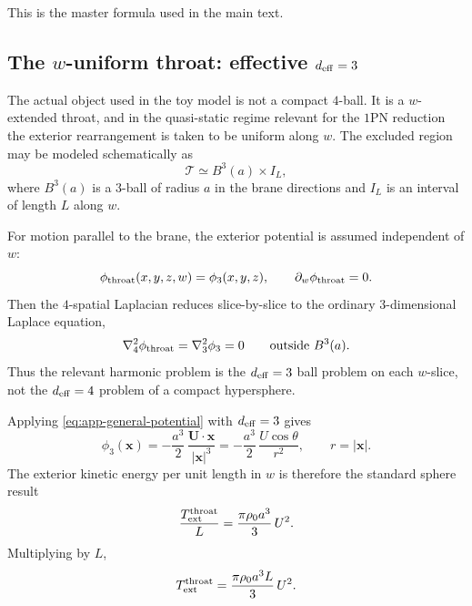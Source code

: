 \documentclass[11pt]{article}
\newcommand{\x}{\mathbf x}
\begin{document}
This is the master formula used in the main text.

\subsection{The \(w\)-uniform throat: effective \(d_{\rm eff}=3\)}
\label{app:added-mass-throat}

The actual object used in the toy model is not a compact \(4\)-ball. It is a
\(w\)-extended throat, and in the quasi-static regime relevant for the \(1\)PN reduction
the exterior rearrangement is taken to be uniform along \(w\). The excluded region may be
modeled schematically as
\begin{equation}
\mathcal T \simeq B^3(a)\times I_L,
\label{eq:app-throat-geometry}
\end{equation}
where \(B^3(a)\) is a 3-ball of radius \(a\) in the brane directions and \(I_L\) is an
interval of length \(L\) along \(w\).

For motion parallel to the brane, the exterior potential is assumed independent of \(w\):
\begin{equation}
\phi_{\rm throat}(x,y,z,w)=\phi_3(x,y,z),
\qquad
\partial_w\phi_{\rm throat}=0.
\label{eq:app-throat-factorization}
\end{equation}
Then the \(4\)-spatial Laplacian reduces slice-by-slice to the ordinary \(3\)-dimensional
Laplace equation,
\begin{equation}
\nabla_4^2\phi_{\rm throat}
=
\nabla_3^2\phi_3
=
0
\qquad
\text{outside } B^3(a).
\label{eq:app-throat-laplace}
\end{equation}
Thus the relevant harmonic problem is the \(d_{\rm eff}=3\) ball problem on each
\(w\)-slice, not the \(d_{\rm eff}=4\) problem of a compact hypersphere.

Applying \eqref{eq:app-general-potential} with \(d_{\rm eff}=3\) gives
\begin{equation}
\phi_3(\x)
=
-\frac{a^3}{2}\,
\frac{\mathbf U\!\cdot\!\x}{|\x|^3}
=
-\frac{a^3}{2}\,\frac{U\cos\theta}{r^2},
\qquad
r=|\x|.
\label{eq:app-throat-potential}
\end{equation}
The exterior kinetic energy per unit length in \(w\) is therefore the standard sphere
result
\begin{equation}
\frac{T_{\rm ext}^{\rm throat}}{L}
=
\frac{\pi\rho_0 a^3}{3}\,U^2.
\label{eq:app-throat-energy-density}
\end{equation}
Multiplying by \(L\),
\begin{equation}
T_{\rm ext}^{\rm throat}
=
\frac{\pi\rho_0 a^3 L}{3}\,U^2.
\label{eq:app-throat-energy}
\end{equation}
\end{document}
